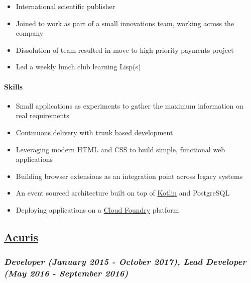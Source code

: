 \begin{itemize}
\tightlist
\item
  International scientific publisher
\item
  Joined to work as part of a small innovations team, working across the
  company
\item
  Dissolution of team resulted in move to high-priority payments project
\item
  Led a weekly lunch club learning Lisp(s)
\end{itemize}

\hypertarget{skills}{%
\paragraph{Skills}\label{skills}}

\begin{itemize}
\tightlist
\item
  Small applications as experiments to gather the maximum information on
  real requirements
\item
  \href{https://continuousdelivery.com/}{Continuous delivery} with
  \href{https://trunkbaseddevelopment.com/}{trunk based development}
\item
  Leveraging modern HTML and CSS to build simple, functional web
  applications
\item
  Building browser extensions as an integration point across legacy
  systems
\item
  An event sourced architecture built on top of
  \href{https://kotlinlang.org/}{Kotlin} and PostgreSQL
\item
  Deploying applications on a \href{https://www.cloudfoundry.org/}{Cloud
  Foundry} platform
\end{itemize}

\hypertarget{acuris-1}{%
\subsection{\texorpdfstring{\href{http://www.acuris.com/}{Acuris}}{Acuris}}\label{acuris-1}}

\hypertarget{developer-january-2015---october-2017-lead-developer-may-2016---september-2016}{%
\subsubsection{\texorpdfstring{\emph{Developer (January 2015 - October
2017), Lead Developer (May 2016 - September
2016)}}{Developer (January 2015 - October 2017), Lead Developer (May 2016 - September 2016)}}\label{developer-january-2015---october-2017-lead-developer-may-2016---september-2016}}

